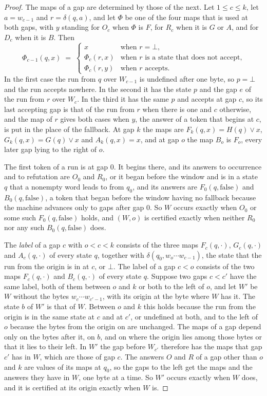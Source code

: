 \documentclass[11pt,a4paper]{article}
\theoremstyle{definition}
\theoremstyle{plain}
\begin{document}
\begin{proof}
The maps of a gap are determined by those of the next. Let $1 \leq c \leq k$, let $a = w_{c-1}$ and $r = \delta(q, a)$,
and let $\Phi$ be one of the four maps that is used at both gaps, with $y$ standing for $O_c$ when $\Phi$ is $F$, for
$R_c$ when it is $G$ or $A$, and for $D_c$ when it is $B$. Then
\[ \Phi_{c-1}(q, x) \;=\; \begin{cases}
  x & \text{when $r = \bot$,} \\
  \Phi_c(r, x) & \text{when $r$ is a state that does not accept,} \\
  \Phi_c(r, y) & \text{when $r$ accepts.}
\end{cases} \]
In the first case the run from $q$ over $W_{c-1}$ is undefined after one byte, so $p = \bot$ and the run accepts
nowhere. In the second it has the state $p$ and the gap $e$ of the run from $r$ over $W_c$. In the third it has the same
$p$ and accepts at gap $c$, so its last accepting gap is that of the run from $r$ when there is one and $c$ otherwise,
and the map of $r$ gives both cases when $y$, the answer of a token that begins at $c$, is put in the place of the
fallback. At gap $k$ the maps are $F_k(q, x) = H(q) \vee x$, $G_k(q, x) = G(q) \vee x$ and $A_k(q, x) = x$, and at gap
$o$ the map $B_o$ is $F_o$, every later gap lying to the right of $o$.

The first token of a run is at gap $0$. It begins there, and its answers to occurrence and to refutation are $O_0$ and
$R_0$, or it began before the window and is in a state $q$ that a nonempty word leads to from $q_0$, and its answers are
$F_0(q, \text{false})$ and $B_0(q, \text{false})$, a token that began before the window having no fallback because the
machine advances only to gaps after gap $0$. So $W$ occurs exactly when $O_0$ or some such $F_0(q, \text{false})$ holds,
and $(W, o)$ is certified exactly when neither $R_0$ nor any such $B_0(q, \text{false})$ does.

The \emph{label} of a gap $c$ with $o < c < k$ consists of the three maps $F_c(q, \cdot)$, $G_c(q, \cdot)$ and
$A_c(q, \cdot)$ of every state $q$, together with $\delta(q_0, w_o \cdots w_{c-1})$, the state that the run from the
origin is in at $c$, or $\bot$. The label of a gap $c < o$ consists of the two maps $F_c(q, \cdot)$ and $B_c(q, \cdot)$
of every state $q$. Suppose two gaps $c < c'$ have the same label, both of them between $o$ and $k$ or both to the left
of $o$, and let $W'$ be $W$ without the bytes $w_c \cdots w_{c'-1}$, with its origin at the byte where $W$ has it. The
state $b$ of $W'$ is that of $W$. Between $o$ and $k$ this holds because the run from the origin is in the same state at
$c$ and at $c'$, or undefined at both, and to the left of $o$ because the bytes from the origin on are unchanged. The
maps of a gap depend only on the bytes after it, on $b$, and on where the origin lies among those bytes or that it lies
to their left. In $W'$ the gap before $W_{c'}$ therefore has the maps that gap $c'$ has in $W$, which are those of gap
$c$. The answers $O$ and $R$ of a gap other than $o$ and $k$ are values of its maps at $q_0$, so the gaps to the left
get the maps and the answers they have in $W$, one byte at a time. So $W'$ occurs exactly when $W$ does, and it is
certified at its origin exactly when $W$ is.


\end{proof}
\end{document}
